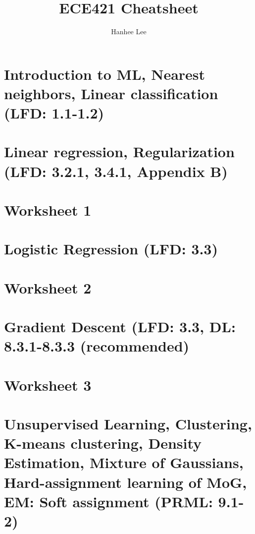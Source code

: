 \documentclass{article}
\title{ECE421 Cheatsheet}
\author{Hanhee Lee}
\begin{document}
\maketitle

\tableofcontents

\listoffigures

\listoftables

\section{Introduction to ML, Nearest neighbors, Linear classification (LFD: 1.1-1.2)}

\newpage

\section{Linear regression, Regularization (LFD: 3.2.1, 3.4.1, Appendix B)}

\newpage

\section{Worksheet 1}

\newpage

\section{Logistic Regression (LFD: 3.3)}

\newpage

\section{Worksheet 2}

\newpage

\section{Gradient Descent (LFD: 3.3, DL: 8.3.1-8.3.3 (recommended)}

\newpage

\section{Worksheet 3}

\newpage

\section{Unsupervised Learning, Clustering, K-means clustering, Density Estimation, Mixture of Gaussians, Hard-assignment learning of MoG, EM: Soft assignment (PRML: 9.1-2)}

\newpage
\end{document}
